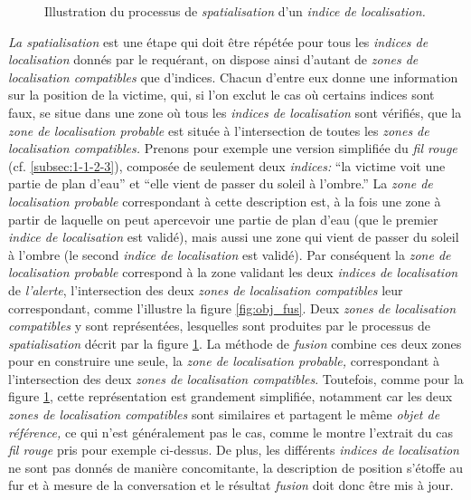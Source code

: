 \begin{figure}[hb]
  \centering
  
  \caption{Illustration du processus de \emph{spatialisation} d'un
    \emph{indice de localisation.}}
  \label{fig:obj_spa}
\end{figure}

\emph{La spatialisation} est une étape qui doit être répétée pour tous
les \emph{indices de localisation} donnés par le requérant, on dispose
ainsi d'autant de \emph{zones de localisation compatibles} que
d'indices. Chacun d'entre eux donne une information sur la position de
la victime, qui, si l'on exclut le cas où certains indices sont faux,
se situe dans une zone où tous les \emph{indices de localisation} sont
vérifiés, \ie que la \emph{zone de localisation probable} est située à
l'intersection de toutes les \emph{zones de localisation compatibles.}
%
Prenons pour exemple une version simplifiée du \emph{fil rouge}
(cf. \autoref{subsec:1-1-2-3}), composée de seulement deux
\emph{indices:} \enquote{la victime voit une partie de plan d'eau} et
\enquote{elle vient de passer du soleil à l'ombre.}  La \emph{zone de
  localisation probable} correspondant à cette description est, à la
fois une zone à partir de laquelle on peut apercevoir une partie de
plan d'eau (\ie que le premier \emph{indice de localisation} est
validé), mais aussi une zone qui vient de passer du soleil à l'ombre
(\ie le second \emph{indice de localisation} est validé). Par
conséquent la \emph{zone de localisation probable} correspond à la
zone validant les deux \emph{indices de localisation} de
\emph{l'alerte}, \ie l'intersection des deux \emph{zones de
  localisation compatibles} leur correspondant, comme l'illustre la
figure \ref{fig:obj_fus}. Deux \emph{zones de localisation
  compatibles} y sont représentées, lesquelles sont produites par le
processus de \emph{spatialisation} décrit par la figure
\ref{fig:obj_spa}. La méthode de \emph{fusion} combine ces deux zones
pour en construire une seule, la \emph{zone de localisation probable,}
correspondant à l'intersection des deux \emph{zones de localisation
  compatibles}. Toutefois, comme pour la figure \ref{fig:obj_spa},
cette représentation est grandement simplifiée, notamment car les deux
\emph{zones de localisation compatibles} sont similaires et partagent
le même \emph{objet de référence,} ce qui n'est généralement pas le
cas, comme le montre l'extrait du cas \emph{fil rouge} pris pour
exemple ci-dessus. De plus, les différents \emph{indices de
  localisation} ne sont pas donnés de manière concomitante, la
description de position s'étoffe au fur et à mesure de la conversation
et le résultat \emph{fusion} doit donc être mis à jour.

